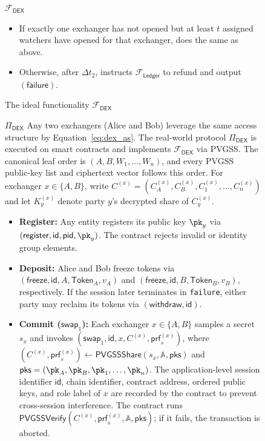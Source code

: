 \documentclass[runningheads]{llncs}
\newcommand{\dex}{\mathcal{F}_{\mathsf{DEX}}}
\newcommand{\swapid}{\mathsf{id}}
\newcommand{\pvgssShare}{\mathsf{PVGSSShare}}
\newcommand{\pvgssVerify}{\mathsf{PVGSSVerify}}
\newcommand{\proofs}{\mathsf{prf}}
\begin{document}
\begin{figure}[!h]
\begin{functionality2}{$\dex$}
\begin{itemize}
\begin{itemize}
        \item If exactly one exchanger has not opened but at least $t$ assigned watchers have opened for that exchanger, does the same as above.
        \item Otherwise, after $\Delta t_2$, instructs $\mathcal{F}_{\mathsf{Ledger}}$ to refund and output $(\mathsf{failure})$.
    \end{itemize}
\end{itemize}
\end{functionality2}
\caption{The ideal functionality $\dex$}
\label{fig:ideal_dex}
\end{figure}


\begin{figure}[!h]
\begin{functionality3}{$\Pi_{\mathsf{DEX}}$}
Any two exchangers (Alice and Bob) leverage the same access structure by Equation~\eqref{eq:dex_as}.
The real-world protocol $\Pi_{\mathsf{DEX}}$ is executed on smart contracts and implements $\mathcal{F}_{\mathsf{DEX}}$ via PVGSS.
The canonical leaf order is $(A,B,W_1,\ldots,W_n)$, and every PVGSS public-key list and ciphertext vector follows this order. For exchanger $x\in\{A,B\}$, write $C^{(x)}=(C_A^{(x)},C_B^{(x)},C_1^{(x)},\ldots,C_n^{(x)})$ and let $K_y^{(x)}$ denote party $y$'s decrypted share of $C_y^{(x)}$.

\begin{itemize}
    \item \textbf{Register:} Any entity registers its public key $\pk_y$ via $(\mathsf{register}, \swapid, \mathsf{pid}, \pk_y)$. The contract rejects invalid or identity group elements.

    \item \textbf{Deposit:} Alice and Bob freeze tokens via $(\mathsf{freeze}, \swapid, A, \mathsf{Token}_A, v_A)$ and  $(\mathsf{freeze}, \swapid, B, \mathsf{Token}_B, v_B)$, respectively. If the session later terminates in \texttt{failure}, either party may reclaim its tokens via $(\mathsf{withdraw}, \swapid)$.
    \item \textbf{Commit (\(\mathsf{swap}_1\)):} Each exchanger $x\in\{A,B\}$ samples a secret $s_x$ and invokes $(\mathsf{swap}_1, \swapid, x, C^{(x)}, \proofs_s^{(x)})$, where $(C^{(x)}, \proofs_s^{(x)}) \gets \pvgssShare(s_x,\mathbb{A}, \mathsf{pks})$ and $\mathsf{pks}=(\pk_A,\pk_B,\pk_1,\ldots,\pk_n)$. The application-level session identifier $\swapid$, chain identifier, contract address, ordered public keys, and role label of $x$ are recorded by the contract to prevent cross-session interference. The contract runs $\pvgssVerify(C^{(x)}, \proofs_s^{(x)}, \mathbb{A},\mathsf{pks})$; if it fails, the transaction is aborted.


\end{itemize}
\end{functionality3}
\end{figure}
\end{document}
